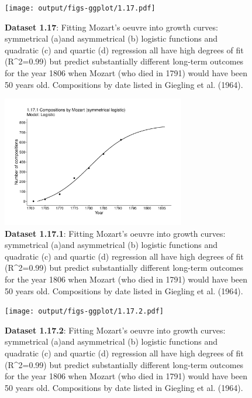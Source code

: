\documentclass[aps,rmp,preprint,superscriptaddress,10pt,onecolumn]{article}
\begin{document}
\begin{figure}[h]
\texttt{[image: output/figs-ggplot/1.17.pdf]}
\caption{\textbf{Dataset 1.17}: Fitting Mozart's oeuvre into growth curves: symmetrical (a)and asymmetrical (b) logistic functions and quadratic (c) and quartic (d) regression all have high degrees of fit (R^2=0.99) but predict substantially different long-term outcomes for the year 1806 when Mozart (who died in 1791) would have been 50 years old. Compositions by date listed in Giegling et al. (1964).}
\end{figure}
	
\begin{figure}[h]
\includegraphics[width=8cm]{output/figs-ggplot/1.17.1.pdf}
\caption{\textbf{Dataset 1.17.1}: Fitting Mozart's oeuvre into growth curves: symmetrical (a)and asymmetrical (b) logistic functions and quadratic (c) and quartic (d) regression all have high degrees of fit (R^2=0.99) but predict substantially different long-term outcomes for the year 1806 when Mozart (who died in 1791) would have been 50 years old. Compositions by date listed in Giegling et al. (1964).}
\end{figure}
	
\begin{figure}[h]
\texttt{[image: output/figs-ggplot/1.17.2.pdf]}
\caption{\textbf{Dataset 1.17.2}: Fitting Mozart's oeuvre into growth curves: symmetrical (a)and asymmetrical (b) logistic functions and quadratic (c) and quartic (d) regression all have high degrees of fit (R^2=0.99) but predict substantially different long-term outcomes for the year 1806 when Mozart (who died in 1791) would have been 50 years old. Compositions by date listed in Giegling et al. (1964).}
\end{figure}
	
\end{document}
